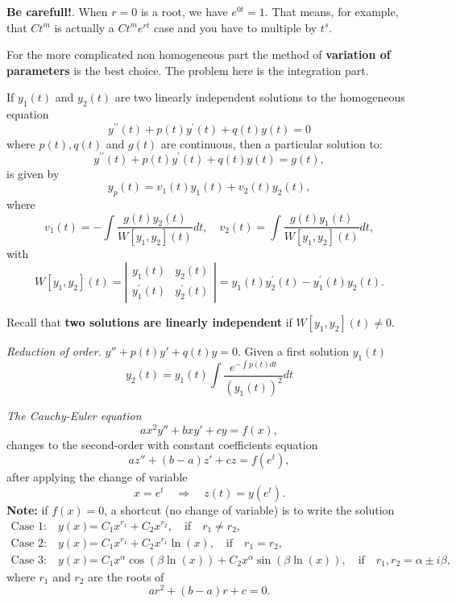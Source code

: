 \documentclass[11pt]{article}
\begin{document}
\begin{preamble}
\begin{formulaitem}
\textbf{Be carefull!}. When $r=0$ is a root, we have $e^{0t}=1$. That means, for example, that $C t^{m}$ is actually a $C t^{m}e^{rt}$ case and you have to multiple by $t^s$.
\vspace{10pt}

\item For the more complicated non homogeneous part the method of \textbf{variation of parameters} is the best choice. The problem here is the integration part.

If $y_{1}(t)$ and $y_{2}(t)$ are two linearly independent solutions to the homogeneous equation
\begin{equation*}\label{formula: homogenous equation}
y^{\prime \prime}(t) + p(t)y^{\prime}(t)+q(t)y(t) = 0
\end{equation*}
where $p(t),q(t)$ and $g(t)$ are continuous, then a particular solution to:
\begin{equation*}\label{formula: particular equation}
y^{\prime \prime}(t) + p(t)y^{\prime}(t)+q(t)y(t) = g(t),
\end{equation*}
is given by \[y_{p}(t) = v_{1}(t) y_{1}(t) + v_{2}(t) y_{2}(t),\] where 
\begin{equation*}\label{formula: system solution}
v_{1}(t) = - \int \dfrac{g(t) y_{2}(t)}{W[y_{1},y_{2}](t)} dt, \quad v_{2}(t) =  \int \dfrac{g(t) y_{1}(t)}{W[y_{1},y_{2}](t)} dt,
\end{equation*}
with 
\[W[y_{1},y_{2}](t) = \left| \begin{array}{cc} y_{1}(t) & y_{2}(t) \\
y_{1}^{\prime}(t) & y_{2}^{\prime}(t) \end{array} \right| =  y_{1}(t)y_{2}^{\prime}(t)-y_{1}^{\prime}(t)y_{2}(t).\]

Recall that \textbf{two solutions are linearly independent} if  $W[y_{1},y_{2}](t)\neq 0$.


\item \textsl{Reduction of order.} $y''+p(t)y'+q(t)y=0$. Given a first solution $y_{1}(t)$
\[\boxed{y_{2}(t)=y_{1}(t)\int\frac{e^{-\int p(t) dt}}{(y_{1}(t))^{2}}dt}\]

\item \textsl{The Cauchy-Euler equation} \[a x^{2}y'' +bxy' + c y = f(x),\] changes to the second-order with constant coefficients equation \[az'' +(b-a)z'+cz=f(e^{t}),\] after applying the change of variable \[x = e^{t} \quad \Rightarrow \quad z(t) = y(e^{t}).\]
\textbf{Note:} if $f(x)=0$, a shortcut (no change of variable) is to write the solution 
\begin{align*}
\text{Case 1:} \quad y(x)&=C_{1}x^{r_{1}}+C_{2}x^{r_{2}}, \quad \text{if}\quad r_{1}\neq r_{2}, \\
\text{Case 2:} \quad y(x)&=C_{1}x^{r_{1}}+C_{2}x^{r_{1}}\ln (x), \quad \text{if}\quad r_{1}= r_{2}, \\
\text{Case 3:} \quad y(x)&=C_{1}x^{\alpha}\cos(\beta \ln (x) )+C_{2}x^{\alpha}\sin(\beta \ln (x) ), \quad \text{if}\quad r_{1}, r_{2} = \alpha \pm i \beta,
\end{align*}
where $r_{1}$ and $r_{2}$ are the roots of \[ar^{2}+(b-a)r+c=0.\]


\end{formulaitem}
\end{preamble}
\end{document}
